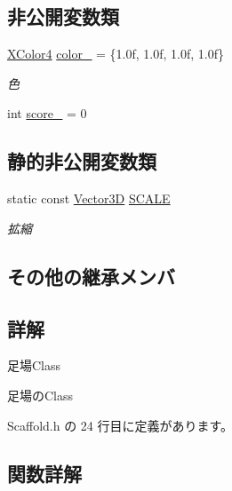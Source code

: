 \subsection*{非公開変数類}
\begin{DoxyCompactItemize}
\item 
\mbox{\hyperlink{_vector3_d_8h_a680c30c4a07d86fe763c7e01169cd6cc}{X\+Color4}} \mbox{\hyperlink{class_scaffold_ada7fa88a4cd38eb3a0fc73b7f6200259}{color\+\_\+}} = \{1.\+0f, 1.\+0f, 1.\+0f, 1.\+0f\}
\begin{DoxyCompactList}\small\item\em 色 \end{DoxyCompactList}\item 
int \mbox{\hyperlink{class_scaffold_a83570adc2d88e3047f70c070a82381bf}{score\+\_\+}} = 0
\end{DoxyCompactItemize}
\subsection*{静的非公開変数類}
\begin{DoxyCompactItemize}
\item 
static const \mbox{\hyperlink{class_vector3_d}{Vector3D}} \mbox{\hyperlink{class_scaffold_a23fdba623ffbf08d9c7d082fa5951e45}{S\+C\+A\+LE}}
\begin{DoxyCompactList}\small\item\em 拡縮 \end{DoxyCompactList}\end{DoxyCompactItemize}
\subsection*{その他の継承メンバ}


\subsection{詳解}
足場\+Class 

足場の\+Class 

 Scaffold.\+h の 24 行目に定義があります。



\subsection{関数詳解}
\mbox{\label{class_scaffold_aafdfc19bcd0080b91dfbb2432b86a93d}} 
